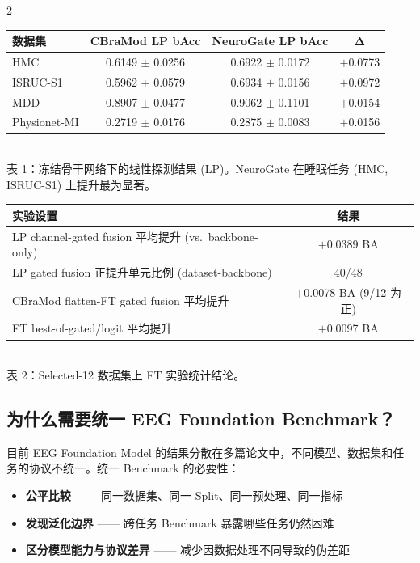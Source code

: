 \documentclass[12pt, a0paper]{article}
\renewcommand{\small}{\fontsize{18}{24}\selectfont}
\renewcommand{\footnotesize}{\fontsize{15}{20}\selectfont}
\begin{document}
\begin{multicols}{2}
{\footnotesize
\begin{center}
\begin{tabular}{lccc}
\toprule
\textbf{数据集} & \textbf{CBraMod LP bAcc} & \textbf{NeuroGate LP bAcc} & \(\mathbf{\Delta}\) \\
\midrule
HMC & 0.6149 \(\pm\) 0.0256 & 0.6922 \(\pm\) 0.0172 & \cellcolor{mygreen!15}\(+\)0.0773 \\
ISRUC-S1 & 0.5962 \(\pm\) 0.0579 & 0.6934 \(\pm\) 0.0156 & \cellcolor{mygreen!15}\(+\)0.0972 \\
MDD & 0.8907 \(\pm\) 0.0477 & 0.9062 \(\pm\) 0.1101 & \(+\)0.0154 \\
Physionet-MI & 0.2719 \(\pm\) 0.0176 & 0.2875 \(\pm\) 0.0083 & \(+\)0.0156 \\
\bottomrule
\end{tabular}
\\[4pt]
{\small\color{mygray}表 1：冻结骨干网络下的线性探测结果 (LP)。NeuroGate 在睡眠任务 (HMC, ISRUC-S1) 上提升最为显著。}
\label{tab:neurogate-lp}
\end{center}
}

{\footnotesize
\begin{center}
\begin{tabular}{lc}
\toprule
\textbf{实验设置} & \textbf{结果} \\
\midrule
LP channel-gated fusion 平均提升 (vs.\ backbone-only) & \cellcolor{mygreen!15}\(+\)0.0389 BA \\
LP gated fusion 正提升单元比例 (dataset-backbone) & 40/48 \\
CBraMod flatten-FT gated fusion 平均提升 & \(+\)0.0078 BA (9/12 为正) \\
FT best-of-gated/logit 平均提升 & \(+\)0.0097 BA \\
\bottomrule
\end{tabular}
\\[4pt]
{\small\color{mygray}表 2：Selected-12 数据集上 FT 实验统计结论。}
\label{tab:neurogate-ft}
\end{center}
}

\subsection{为什么需要统一 EEG Foundation Benchmark？}

目前 EEG Foundation Model 的结果分散在多篇论文中，不同模型、数据集和任务的协议不统一。统一 Benchmark 的必要性：

\begin{itemize}
    \item \textbf{公平比较} —— 同一数据集、同一 Split、同一预处理、同一指标
    \item \textbf{发现泛化边界} —— 跨任务 Benchmark 暴露哪些任务仍然困难
    \item \textbf{区分模型能力与协议差异} —— 减少因数据处理不同导致的伪差距
\end{itemize}


\end{multicols}
\end{document}
